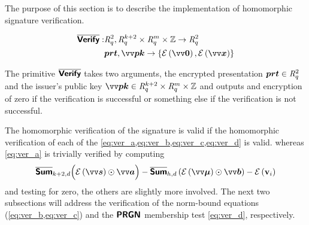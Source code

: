 The purpose of this section is to describe the implementation of homomorphic signature verification.

\begin{equation} \label{eq:hverify}
\begin{split}
\overline{\bkw{Verify}}: &\intring_q^2,\intring_q^{k+2}\times\intring_q^m\times\Z \rightarrow \intring_q^2\\
      &\p{prt},\pv{pk} \rightarrow \left\{\enc{\pv{0}},\enc{\pv{x}}\right\}
\end{split}
\end{equation}

The primitive $\overline{\textsf{\textbf{Verify}}}$ takes two arguments, the encrypted presentation $\bm{prt}\in \mathit{R}_q^2$ and the issuer's public key $\pv{pk}\in \intring_q^{k+2}\times\intring_q^m\times\Z$ and outputs and encryption of zero if the verification is successful or something else if the verification is not successful.

The homomorphic verification of the signature is valid if the homomorphic verification of each of the \cref{eq:ver_a,eq:ver_b,eq:ver_c,eq:ver_d} is valid. whereas \cref{eq:ver_a} is trivially verified by computing 
\begin{equation}\label{eq:hvera}
\SUM_{k+2,d}\Bigl(\enc{\pv{s}}\odot \pv{a}\Bigr)-\SUM_{h,d}\left(\enc{\pv{\mu}}\odot \pv{b}\right)-\enc{\pvv_i}        
\end{equation}
and testing for zero, the others are slightly more involved. The next two subsections will address the verification of the norm-bound equations (\cref{eq:ver_b,eq:ver_c}) and the $\textsf{\textbf{PRGN}}$ membership test \cref{eq:ver_d}, respectively.




